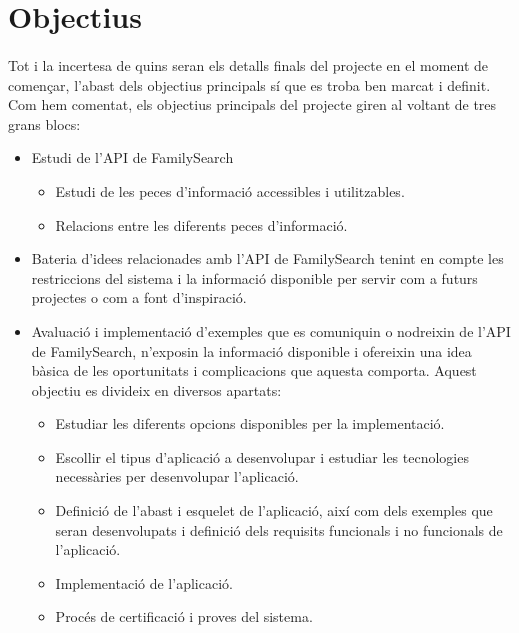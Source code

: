 \section{Objectius}

    \paragraph{}
    Tot i la incertesa de quins seran els detalls finals del projecte en el moment de començar, l’abast dels objectius principals sí que es troba ben marcat i definit. Com hem comentat, els objectius principals del projecte giren al voltant de tres grans blocs:

    \begin{itemize}
        \item Estudi de l’\gls{API} de FamilySearch
        \begin{itemize}
            \item Estudi de les peces d’informació accessibles i utilitzables.
            \item Relacions entre les diferents peces d’informació.
        \end{itemize}
        \item Bateria d'idees relacionades amb l’\gls{API} de FamilySearch tenint en compte les restriccions del sistema i la informació disponible per servir com a futurs projectes o com a font d'inspiració.
        \item Avaluació i implementació d’exemples que es comuniquin o nodreixin de l’\gls{API} de FamilySearch, n’exposin la informació disponible i ofereixin una idea bàsica de les oportunitats i complicacions que aquesta comporta. Aquest objectiu es divideix en diversos apartats:
        \begin{itemize}
            \item Estudiar les diferents opcions disponibles per la implementació.
            \item Escollir el tipus d’aplicació a desenvolupar i estudiar les tecnologies necessàries per desenvolupar l'aplicació.
            \item Definició de l’abast i esquelet de l’aplicació, així com dels exemples que seran desenvolupats i definició dels requisits funcionals i no funcionals de l'aplicació.
            \item Implementació de l’aplicació.
            \item Procés de certificació i proves del sistema.
        \end{itemize}
    \end{itemize}

